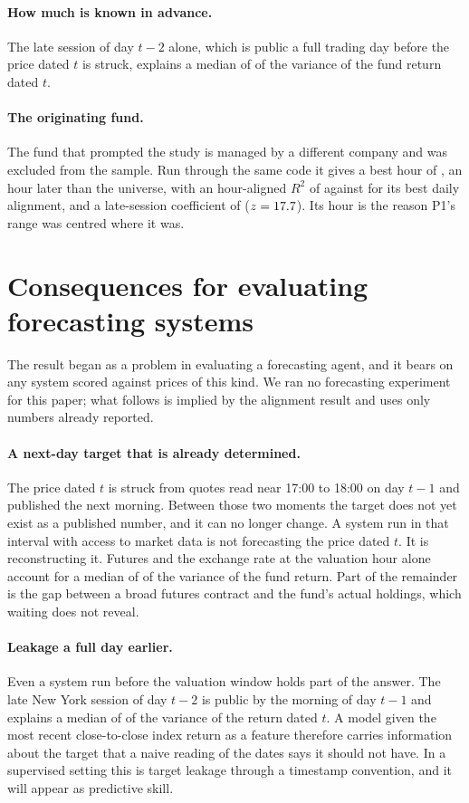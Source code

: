 \documentclass[11pt,a4paper]{article}
\begin{document}
\paragraph{How much is known in advance.} The late session of day $t-2$ alone,
which is public a full trading day before the price dated $t$ is struck,
explains a median of \MedRLate{} of the variance of the fund return dated $t$.

\paragraph{The originating fund.} The fund that prompted the study is managed
by a different company and was excluded from the sample. Run through the same
code it gives a best hour of \DiscHour, an hour later than the universe, with
an hour-aligned $R^{2}$ of \DiscBestR{} against \DiscRefR{} for its best daily
alignment, and a late-session coefficient of \DiscBL{} ($z=17.7$). Its hour
is the reason P1's range was centred where it was.

\section{Consequences for evaluating forecasting systems}\label{sec:forecasting}

The result began as a problem in evaluating a forecasting agent, and it bears
on any system scored against prices of this kind. We ran no forecasting
experiment for this paper; what follows is implied by the alignment result
and uses only numbers already reported.

\paragraph{A next-day target that is already determined.} The price dated $t$
is struck from quotes read near 17:00 to 18:00 on day $t-1$ and published the
next morning. Between those two moments the target does not yet exist as a
published number, and it can no longer change. A system run in that interval
with access to market data is not forecasting the price dated $t$. It is
reconstructing it. Futures and the exchange rate at the valuation hour alone
account for a median of \MedBestR{} of the variance of the fund return. Part
of the remainder is the gap between a broad futures contract and the fund's
actual holdings, which waiting does not reveal.

\paragraph{Leakage a full day earlier.} Even a system run before the valuation
window holds part of the answer. The late New York session of day $t-2$ is
public by the morning of day $t-1$ and explains a median of \MedRLate{} of the
variance of the return dated $t$. A model given the most recent
close-to-close index return as a feature therefore carries information about
the target that a naive reading of the dates says it should not have. In a
supervised setting this is target leakage through a timestamp convention, and
it will appear as predictive skill.
\end{document}
